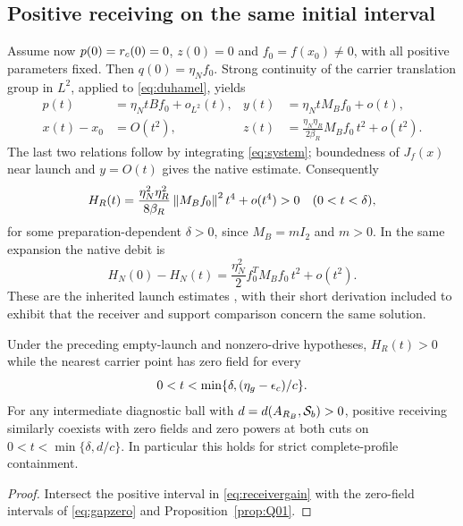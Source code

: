 \subsection{Positive receiving on the same initial interval}\label{sec:positive}
Assume now $p(0)=r_c(0)=0$, $z(0)=0$ and $f_0=f(x_0)\ne0$, with all positive parameters fixed. Then $q(0)=\eta_Nf_0$. Strong continuity of the carrier translation group in $L^2$, applied to \eqref{eq:duhamel}, yields
\begin{equation}\label{eq:launchseries}
 \begin{aligned}
 p(t)&=\eta_NtBf_0+o_{L^2}(t),&
 y(t)&=\eta_NtM_Bf_0+o(t),\\
 x(t)-x_0&=O(t^2),&
 z(t)&=\frac{\eta_N\eta_R}{2\beta_R}M_Bf_0\,t^2+o(t^2).
 \end{aligned}
\end{equation}
The last two relations follow by integrating \eqref{eq:system}; boundedness of $J_f(x)$ near launch and $y=O(t)$ gives the native estimate. Consequently
\begin{equation}\label{eq:receivergain}
 H_R(t)=\frac{\eta_N^2\eta_R^2}{8\beta_R}\left\lVert M_Bf_0\right\rVert^2t^4+o(t^4)>0
 \quad(0<t<\delta),
\end{equation}
for some preparation-dependent $\delta>0$, since $M_B=mI_2$ and $m>0$. In the same expansion the native debit is
\begin{equation}\label{eq:nativedebit}
 H_N(0)-H_N(t)=\frac{\eta_N^2}{2}f_0^TM_Bf_0\,t^2+o(t^2).
\end{equation}
These are the inherited launch estimates \cite{RX}, with their short derivation included to exhibit that the receiver and support comparison concern the same solution.

\begin{theorem}\label{thm:early}
Under the preceding empty-launch and nonzero-drive hypotheses, $H_R(t)>0$ while the nearest carrier point has zero field for every
\begin{equation}\label{eq:earlyinterval}
 0<t<\min\{\delta,(\eta_g-\epsilon_c)/c\}.
\end{equation}
For any intermediate diagnostic ball with $d=d(A_{R_B},\mathcal S_b)>0$, positive receiving similarly coexists with zero fields and zero powers at both cuts on $0<t<\min\{\delta,d/c\}$. In particular this holds for strict complete-profile containment.
\end{theorem}
\begin{proof}
Intersect the positive interval in \eqref{eq:receivergain} with the zero-field intervals of \eqref{eq:gapzero} and Proposition~\ref{prop:Q01}.
\end{proof}

